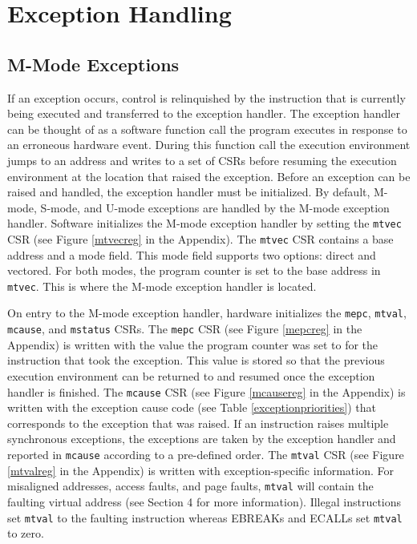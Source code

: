 \documentclass[12pt]{article}
\begin{document}
\section{Exception Handling}
\subsection{M-Mode Exceptions}
If an exception occurs, control is relinquished by the instruction that is currently being executed and transferred to the exception handler. The exception handler can be thought of as a software function call the program executes in response to an erroneous hardware event. During this function call the execution environment jumps to an address and writes to a set of CSRs before resuming the execution environment at the location that raised the exception. Before an exception can be raised and handled, the exception handler must be initialized. By default, M-mode, S-mode, and U-mode exceptions are handled by the M-mode exception handler. Software initializes the M-mode exception handler by setting the {\tt{mtvec}} CSR (see Figure \ref{mtvecreg} in the Appendix). The {\tt{mtvec}} CSR contains a base address and a mode field. This mode field supports two options: direct and vectored. For both modes, the program counter is set to the base address in {\tt{mtvec}}. This is where the M-mode exception handler is located.

On entry to the M-mode exception handler, hardware initializes the {\tt{mepc}}, {\tt{mtval}}, {\tt{mcause}}, and {\tt{mstatus}} CSRs. The {\tt{mepc}} CSR (see Figure \ref{mepcreg} in the Appendix) is written with the value the program counter was set to for the instruction that took the exception. This value is stored so that the previous execution environment can be returned to and resumed once the exception handler is finished. The {\tt{mcause}} CSR (see Figure \ref{mcausereg} in the Appendix) is written with the exception cause code (see Table \ref{exceptionpriorities}) that corresponds to the exception that was raised. If an instruction raises multiple synchronous exceptions, the exceptions are taken by the exception handler and reported in {\tt{mcause}} according to a pre-defined order. The {\tt{mtval}} CSR (see Figure \ref{mtvalreg} in the Appendix) is written with exception-specific information. For misaligned addresses, access faults, and page faults, {\tt{mtval}} will contain the faulting virtual address (see Section 4 for more information). Illegal instructions set {\tt{mtval}} to the faulting instruction whereas EBREAKs and ECALLs set {\tt{mtval}} to zero. 
\end{document}
